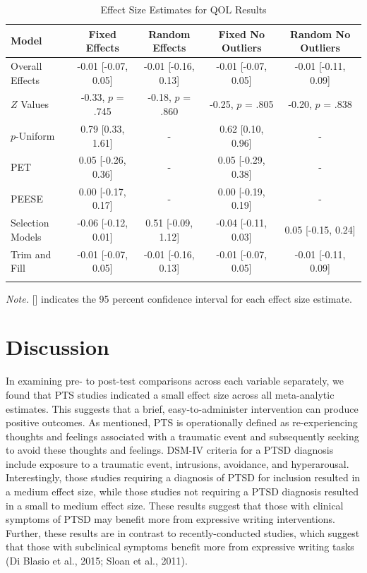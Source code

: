 \documentclass[,man]{apa6}
\begin{document}
\begin{table}[tbp]
\begin{center}
\begin{threeparttable}
\caption{\label{tab:QOLtable}Effect Size Estimates for QOL Results}
\small{
\begin{tabular}{lcccc}
\toprule
Model & Fixed Effects & Random Effects & Fixed No Outliers & Random No Outliers\\
\midrule
Overall Effects & -0.01 [-0.07, 0.05] & -0.01 [-0.16, 0.13] & -0.01 [-0.07, 0.05] & -0.01 [-0.11, 0.09]\\
$Z$ Values & -0.33, $p$ = .745 & -0.18, $p$ = .860 & -0.25, $p$ = .805 & -0.20, $p$ = .838\\
$p$-Uniform & 0.79 [0.33, 1.61] & - & 0.62 [0.10, 0.96] & -\\
PET & 0.05 [-0.26, 0.36] & - & 0.05 [-0.29, 0.38] & -\\
PEESE & 0.00 [-0.17, 0.17] & - & 0.00 [-0.19, 0.19] & -\\
Selection Models & -0.06 [-0.12, 0.01] & 0.51 [-0.09, 1.12] & -0.04 [-0.11, 0.03] & 0.05 [-0.15, 0.24]\\
Trim and Fill & -0.01 [-0.07, 0.05] & -0.01 [-0.16, 0.13] & -0.01 [-0.07, 0.05] & -0.01 [-0.11, 0.09]\\
\bottomrule
\addlinespace
\end{tabular}
}
\begin{tablenotes}[para]
\normalsize{\textit{Note.} [] indicates the 95 percent confidence interval for each effect size estimate.}
\end{tablenotes}
\end{threeparttable}
\end{center}
\end{table}

\hypertarget{discussion}{%
\section{Discussion}\label{discussion}}

In examining pre- to post-test comparisons across each variable separately, we found that PTS studies indicated a small effect size across all meta-analytic estimates. This suggests that a brief, easy-to-administer intervention can produce positive outcomes. As mentioned, PTS is operationally defined as re-experiencing thoughts and feelings associated with a traumatic event and subsequently seeking to avoid these thoughts and feelings. DSM-IV criteria for a PTSD diagnosis include exposure to a traumatic event, intrusions, avoidance, and hyperarousal. Interestingly, those studies requiring a diagnosis of PTSD for inclusion resulted in a medium effect size, while those studies not requiring a PTSD diagnosis resulted in a small to medium effect size. These results suggest that those with clinical symptoms of PTSD may benefit more from expressive writing interventions. Further, these results are in contrast to recently-conducted studies, which suggest that those with subclinical symptoms benefit more from expressive writing tasks (Di Blasio et al., 2015; Sloan et al., 2011).
\end{document}
